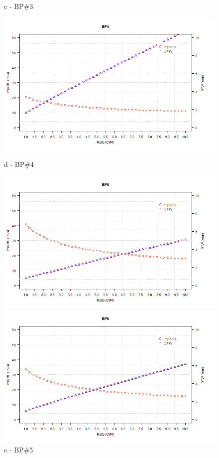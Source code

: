 \begin{figure}[!htb]
\begin{minipage}[b]{0.5\linewidth}
		\caption*{c - BP\#3}
	\end{minipage}
	\hspace{0.05cm}
	\begin{minipage}[b]{0.5\linewidth}
		\centering
		\includegraphics[width=\textwidth]{figures/ch05_fig_sacipi_pump4}
		\caption*{d - BP\#4}
	\end{minipage}
	\hspace{0.05cm}
	\begin{minipage}[b]{0.5\linewidth}
		\centering
		\includegraphics[width=\textwidth]{figures/ch05_fig_sacipi_pump5}
		\caption*{e - BP\#5}
	\end{minipage}
	\hspace{0.05cm}
	\begin{minipage}[b]{0.5\linewidth}
		\centering
		\includegraphics[width=\textwidth]{figures/ch05_fig_sacipi_pump6}

\end{minipage}
\end{figure}
